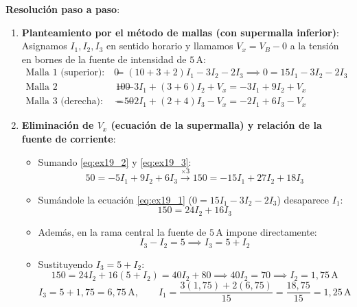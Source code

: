 \begin{ejercicio}
\textbf{Resolución paso a paso}:
\begin{enumerate}
    \item \textbf{Planteamiento por el método de mallas (con supermalla inferior)}:
    Asignamos $I_1, I_2, I_3$ en sentido horario y llamamos $V_x = V_B - 0$ a la tensión en bornes de la fuente de intensidad de $5\,\si{\ampere}$:
    \begin{align}
        \text{Malla 1 (superior):} \quad 0 &= (10 + 3 + 2)I_1 - 3 I_2 - 2 I_3 \implies 0 = 15 I_1 - 3 I_2 - 2 I_3 \label{eq:ex19_1} \\
        \text{Malla 2 (izquierda):} \quad 100 &= -3 I_1 + (3 + 6)I_2 + V_x = -3 I_1 + 9 I_2 + V_x \label{eq:ex19_2} \\
        \text{Malla 3 (derecha):} \quad -50 &= -2 I_1 + (2 + 4)I_3 - V_x = -2 I_1 + 6 I_3 - V_x \label{eq:ex19_3}
    \end{align}
    \item \textbf{Eliminación de $V_x$ (ecuación de la supermalla) y relación de la fuente de corriente}:
    \begin{itemize}
        \item Sumando \eqref{eq:ex19_2} y \eqref{eq:ex19_3}:
        \begin{equation*}
            50 = -5 I_1 + 9 I_2 + 6 I_3 \xrightarrow{\times 3} 150 = -15 I_1 + 27 I_2 + 18 I_3
        \end{equation*}
        \item Sumándole la ecuación \eqref{eq:ex19_1} ($0 = 15 I_1 - 3 I_2 - 2 I_3$) desaparece $I_1$:
        \begin{equation*}
            150 = 24 I_2 + 16 I_3
        \end{equation*}
        \item Además, en la rama central la fuente de $5\,\si{\ampere}$ impone directamente:
        \begin{equation*}
            I_3 - I_2 = 5 \implies I_3 = 5 + I_2
        \end{equation*}
        \item Sustituyendo $I_3 = 5 + I_2$:
        \begin{equation*}
            150 = 24 I_2 + 16(5 + I_2) = 40 I_2 + 80 \implies 40 I_2 = 70 \implies \boxed{I_2 = 1{,}75\,\si{\ampere}}
        \end{equation*}
        \begin{equation*}
            \boxed{I_3 = 5 + 1{,}75 = 6{,}75\,\si{\ampere}}, \qquad \boxed{I_1 = \frac{3(1{,}75) + 2(6{,}75)}{15} = \frac{18{,}75}{15} = 1{,}25\,\si{\ampere}}

\end{equation*}
\end{itemize}
\end{enumerate}
\end{ejercicio}
